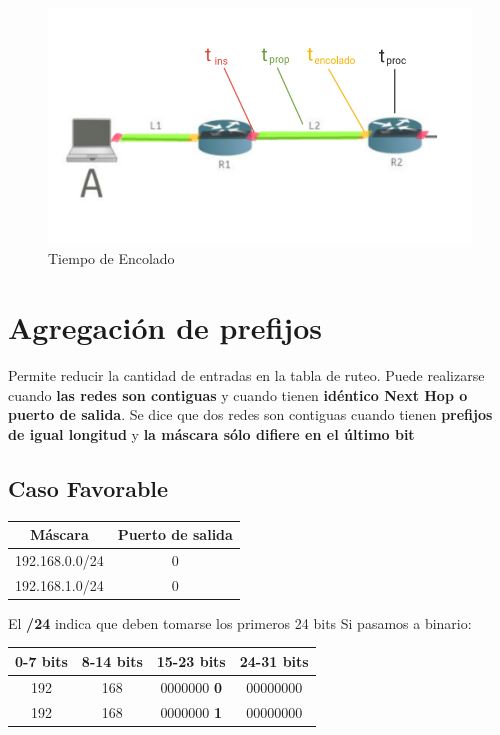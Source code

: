 \documentclass[titlepage,a4paper]{article}
\begin{document}
\begin{figure}[H]
\centering
\includegraphics[width=\textwidth]{tiemposRTT.png}
\caption{Tiempo de Encolado}
\end{figure}

\section{Agregación de prefijos}\label{sec:agrprefijos}

Permite reducir la cantidad de entradas en la tabla de ruteo. Puede realizarse cuando \textbf{las redes son contiguas} y cuando tienen \textbf{idéntico Next Hop o puerto de salida}. Se dice que dos redes son contiguas cuando tienen \textbf{prefijos de igual longitud} y \textbf{la máscara sólo difiere en el último bit}


\subsection{Caso Favorable}

\begin{center}
    \begin{tabular}{c|c}
        Máscara & Puerto de salida \\
        \hline
        \hline
         192.168.0.0/24 &  0\\
         \hline
         192.168.1.0/24 &  0
    \end{tabular}
\end{center}

El \textbf{/24} indica que deben tomarse los primeros 24 bits
Si pasamos a binario:

\begin{center}
    \begin{tabular}{c|c|c|c}
        0-7 bits & 8-14 bits & 15-23 bits & 24-31 bits \\
        \hline
        \hline
        192 & 168 & 0000000 \textbf{0} & 00000000 \\
        \hline
        192 & 168 & 0000000 \textbf{1} & 00000000 \\
    \end{tabular}
\end{center}
\end{document}
